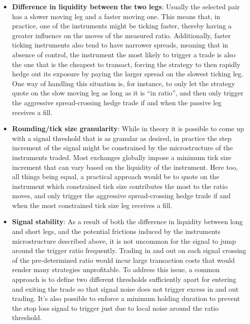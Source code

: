 \begin{itemize}
\item \textbf{Difference in liquidity between the two legs}: Usually the selected pair has a slower moving leg and a faster moving one. This means that, in practice, one of the instruments might be ticking faster, thereby having a greater influence on the moves of the measured ratio. Additionally, faster ticking instruments also tend to have narrower spreads, meaning that in absence of control, the instrument the most likely to trigger a trade is also the one that is the cheapest to transact, forcing the strategy to then rapidly hedge out its exposure by paying the larger spread on the slowest ticking leg. One way of handling this situation is, for instance, to only let the strategy quote on the slow moving leg as long as it is ``in ratio'', and then only trigger the aggressive spread-crossing hedge trade if and when the passive leg receives a fill. 

\item \textbf{Rounding/tick size granularity}: While in theory it is possible to come up with a signal threshold that is as granular as desired, in practice the step increment of the signal might be constrained by the microstructure of the instruments traded. Most exchanges globally impose a minimum tick size increment that can vary based on the liquidity of the instrument. Here too, all things being equal, a practical approach would be to quote on the instrument which constrained tick size contributes the most to the ratio moves, and only trigger the aggressive spread-crossing hedge trade if and when the most constrained tick size leg receives a fill. 

\item \textbf{Signal stability}: As a result of both the difference in liquidity between long and short legs, and the potential frictions induced by the instruments microstructure described above, it is not uncommon for the signal to jump around the trigger ratio frequently. Trading in and out on each signal crossing of the pre-determined ratio would incur large transaction costs that would render many strategies unprofitable. To address this issue, a common approach is to define two different thresholds sufficiently apart for entering and exiting the trade so that signal noise does not trigger excess in and out trading. It's also possible to enforce a minimum holding duration to prevent the stop loss signal to trigger just due to local noise around the ratio threshold. 


\end{itemize}
